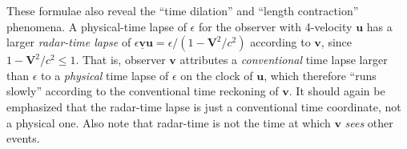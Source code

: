 \documentclass[\ifafour a4paper,12pt,\else a5paper,10pt,\fi%
onecolumn,oneside,article,%
british%
]{memoir}
\theoremstyle{remark}
\theoremstyle{innote}
\renewcommand*{\le}{\leqslant}%
\renewcommand*{\|}[1][]{\nonscript\:#1\vert\nonscript\:\mathopen{}}
\newcommand*{\yv}{\bm{v}}
\newcommand*{\yvu}{\underline{\yv}}
\newcommand*{\yu}{\bm{u}}
\newcommand*{\yV}{\bm{V}}
\begin{document}
These formulae also reveal the \enquote{time dilation} and \enquote{length contraction} phenomena. A physical-time lapse of $\epsilon$ for the observer with 4-velocity $\yu$ has a larger \emph{radar-time lapse} of $\epsilon\yvu\yu = \epsilon/(1-\yV^{2}/c^{2})$ according to $\yv$, since $1-\yV^{2}/c^{2} \le 1$. That is,
observer $\yv$ attributes a \emph{conventional} time lapse larger than $\epsilon$ to a \emph{physical} time lapse of $\epsilon$ on the clock of $\yu$, which therefore \enquote{runs slowly} according to the conventional time reckoning of $\yv$. It should again be emphasized that the radar-time lapse is just a conventional time coordinate, not a physical one. Also note that radar-time is not the time at which $\yv$ \emph{sees} other events.

\medskip
\end{document}
